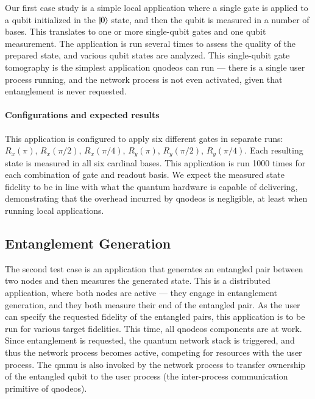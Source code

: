 Our first case study is a simple local application where a single gate is applied to a qubit
initialized in the $\ket{0}$ state, and then the qubit is measured in a number of bases. This
translates to one or more single-qubit gates and one qubit measurement. The application is run
several times to assess the quality of the prepared state, and various qubit states are analyzed.
This single-qubit gate tomography is the simplest application \acrshort{qnodeos} can run --- there
is a single user process running, and the network process is not even activated, given that
entanglement is never requested.

\paragraph{Configurations and expected results}

This application is configured to apply six different gates in separate runs: $R_x(\pi)$,
$R_x(\pi/2)$, $R_x(\pi/4)$, $R_y(\pi)$, $R_y(\pi/2)$, $R_y(\pi/4)$. Each resulting state is measured
in all six cardinal bases. This application is run \num{1000} times for each combination of gate and
readout basis. We expect the measured state fidelity to be in line with what the quantum hardware is
capable of delivering, demonstrating that the overhead incurred by \acrshort{qnodeos} is negligible,
at least when running local applications.

%

\subsection{Entanglement Generation}

The second test case is an application that generates an entangled pair between two nodes and then
measures the generated state. This is a distributed application, where both nodes are active ---
they engage in entanglement generation, and they both measure their end of the entangled pair. As
the user can specify the requested fidelity of the entangled pairs, this application is to be run
for various target fidelities. This time, all \acrshort{qnodeos} components are at work. Since
entanglement is requested, the quantum network stack is triggered, and thus the network process
becomes active, competing for resources with the user process. The \acrshort{qmmu} is also invoked
by the network process to transfer ownership of the entangled qubit to the user process (the
inter-process communication primitive of \acrshort{qnodeos}).


